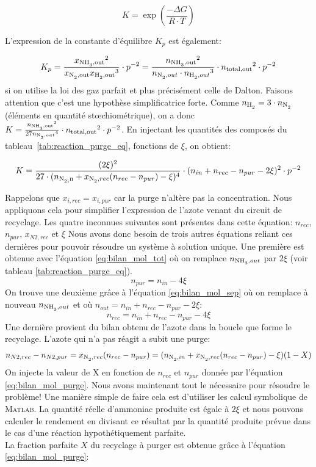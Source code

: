 \[
K=\exp{\left(\frac{-\Delta G}{R \cdot T}\right)}\]

L'expression de la constante d'équilibre $K_p$ est également: 

\[
K_p=\frac{{x_{\ce{NH3},\text{out}}}^2}{x_{\ce{N2},\text{out}}{x_{\ce{H2},\text{out}}}^3} \cdot p^{-2} = 
\frac{{n_{\ce{NH3},\text{out}}}^2}{n_{\ce{N2},out}\cdot {n_{\ce{H2},out}}^3}\cdot {n_{\text{total,out}}}^2\cdot p^{-2}
\]
si on utilise la loi des gaz parfait et plus précisément celle de Dalton. Faisons attention que c'est une hypothèse simplificatrice forte. 
Comme $n_{\ce{H2}}=3\cdot n_{\ce{N2}}$ (éléments en quantité stœchiométrique), 
on a donc 
$K=\frac{{n_{\ce{NH3},\text{out}}}^2}{27{n_{\ce{N2},out}}^4} \cdot
{n_{\text{total,out}}}^2\cdot p^{-2}$. 
En injectant les quantités des composés du tableau~\ref{tab:reaction_purge_eq},
fonctions de $\xi$, on obtient:

\[ 
K = 
\frac{({2\xi})^2}{27 \cdot ({{n_{\ce{N2,in}}+x_{\ce{N2},rec}(n_{rec}-n_{pur})-\xi})^4}} \cdot
({n_{in}+n_{rec}-n_{pur}-2\xi})^2 \cdot p^{-2} 
\]

Rappelons que $x_{i,rec}=x_{i,pur}$ car la purge n'altère pas la concentration.
Nous appliquons cela pour simplifier l'expression de l'azote venant du circuit
de recyclage.
Les quatre inconnues suivantes sont présentes dans cette équation: $n_{rec}$, $n_{pur}$, $x_{N2,rec}$ et $\xi$
Nous avons donc besoin de trois autres équations reliant ces dernières pour pouvoir 
résoudre un système à solution unique.
Une première est obtenue avec l'équation \ref{eq:bilan_mol_tot} où on remplace $n_{\ce{NH3},out}$ par
$2 \xi$ (voir tableau \ref{tab:reaction_purge_eq}).
\[n_{pur}=n_{in}-4 \xi \]
On trouve une deuxième grâce à l'équation \ref{eq:bilan_mol_sep} où on remplace à nouveau $n_{\ce{NH3},out}$ et où $n_{out}=n_{in}+n_{rec}-n_{pur}-2\xi$:
\[ n_{rec}=n_{in}+n_{rec}-n_{pur}-4\xi \]
Une dernière provient du bilan obtenu de l'azote dans la boucle que forme le recyclage.
L'azote qui n'a pas réagit a subit une purge:
\[ n_{N2,rec}- n_{N2,pur}=x_{\ce{N2},rec}(n_{rec}- n_{pur})=(n_{\ce{N2},in}+x_{\ce{N2},rec}(n_{rec}- n_{pur})-\xi)(1-X) \]
On injecte la valeur de X en fonction de $n_{rec}$ et $n_{pur}$ donnée par l'équation \ref{eq:bilan_mol_purge}.
Nous avons maintenant tout le nécessaire pour résoudre le problème! Une manière simple de faire cela est d'utiliser les calcul symbolique de \textsc{Matlab}. La quantité réelle d'ammoniac produite est égale à $2 \xi$ et nous pouvons calculer le rendement en divisant ce résultat par la quantité produite prévue dans le cas d'une réaction hypothétiquement parfaite.\\
La fraction parfaite $X$ du recyclage à purger est obtenue grâce à l'équation \ref{eq:bilan_mol_purge}:

